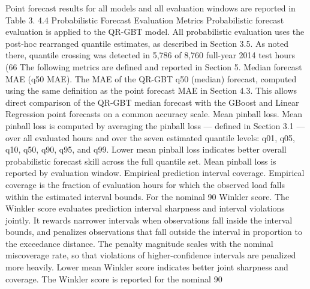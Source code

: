 Point forecast results for all models and all evaluation windows are reported in Table 3.
4.4 Probabilistic Forecast Evaluation Metrics
Probabilistic forecast evaluation is applied to the QR-GBT model. All probabilistic evaluation uses the post-hoc rearranged quantile estimates, as described in Section 3.5. As noted there, quantile crossing was detected in 5,786 of 8,760 full-year 2014 test hours (66%
The following metrics are defined and reported in Section 5.
Median forecast MAE (q50 MAE). The MAE of the QR-GBT q50 (median) forecast, computed using the same definition as the point forecast MAE in Section 4.3. This allows direct comparison of the QR-GBT median forecast with the GBoost and Linear Regression point forecasts on a common accuracy scale.
Mean pinball loss. Mean pinball loss is computed by averaging the pinball loss — defined in Section 3.1 — over all evaluated hours and over the seven estimated quantile levels: q01, q05, q10, q50, q90, q95, and q99. Lower mean pinball loss indicates better overall probabilistic forecast skill across the full quantile set. Mean pinball loss is reported by evaluation window.
Empirical prediction interval coverage. Empirical coverage is the fraction of evaluation hours for which the observed load falls within the estimated interval bounds. For the nominal 90%
Winkler score. The Winkler score evaluates prediction interval sharpness and interval violations jointly. It rewards narrower intervals when observations fall inside the interval bounds, and penalizes observations that fall outside the interval in proportion to the exceedance distance. The penalty magnitude scales with the nominal miscoverage rate, so that violations of higher-confidence intervals are penalized more heavily. Lower mean Winkler score indicates better joint sharpness and coverage. The Winkler score is reported for the nominal 90%

